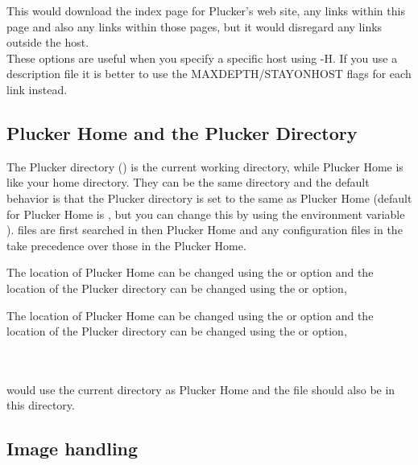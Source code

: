 This would download the index page for Plucker's web site, any links
within this page and also any links within those pages, but it would
disregard any links outside the  host. \\

These options are useful when you specify a specific host using
-H. If you use a description file it is better to use the
MAXDEPTH/STAYONHOST flags for each link instead.

\subsection{Plucker Home and the Plucker Directory}

The Plucker directory () is the current working
directory, while Plucker Home is like your home directory. They can
be the same directory and the default behavior is that the Plucker
directory is set to the same as Plucker Home (default for Plucker
Home is , but you can change this by using
the environment variable ). 
files are first searched in  then Plucker Home
and any configuration files in the  take precedence
over those in the Plucker Home.\\

\begin{latexonly}
The location of Plucker Home can be changed using the 
or  option and the location of
the Plucker directory can be changed using the 
or  option,
\end{latexonly}
\begin{htmlonly}
The location of Plucker Home can be changed using the 
or  option and the location of
the Plucker directory can be changed using the 
or  option,
\end{htmlonly}\\

\\

would use the current directory as Plucker Home and the file 
should also be in this directory.


\subsection{Image handling}

